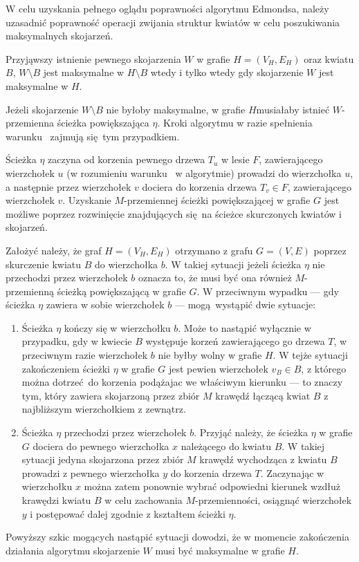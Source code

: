   W celu uzyskania pełnego oglądu poprawności algorytmu Edmondsa, należy uzasadnić poprawność operacji zwijania struktur kwiatów w celu poszukiwania maksymalnych skojarzeń.
  \begin{theorem}
    Przyjąwszy istnienie pewnego skojarzenia $W$ w grafie $H=(V_H, E_H)$ oraz kwiatu $B$, $W \setminus B$ jest maksymalne w $H \setminus B$ wtedy i tylko wtedy gdy skojarzenie $W$ jest maksymalne w $H$.
  \end{theorem}
  \begin{bproof}
    Jeżeli skojarzenie $W \setminus B$ nie byłoby maksymalne, w grafie $H$musiałaby istnieć $W$-przemienna ścieżka powiększająca $\eta$.
    Kroki algorytmu w razie spełnienia warunku~ zajmują się tym przypadkiem.

    Ścieżka $\eta$ zaczyna od korzenia pewnego drzewa $T_u$ w lesie $F$, zawierającego wierzchołek $u$ (w rozumieniu warunku~ w algorytmie) prowadzi do wierzchołka $u$, a następnie przez wierzchołek $v$ dociera do korzenia drzewa $T_v \in F$, zawierającego wierzchołek $v$.
    Uzyskanie $M$-przemiennej ścieżki powiększającej w grafie $G$ jest możliwe poprzez rozwinięcie znajdujących się na ścieżce skurczonych kwiatów i 
    skojarzeń.

    Założyć należy, że graf $H=(V_H, E_H)$ otrzymano z grafu $G=(V, E)$ poprzez skurczenie kwiatu $B$ do wierzchołka $b$.
    W takiej sytuacji jeżeli ścieżka $\eta$ nie przechodzi przez wierzchołek $b$ oznacza to, że musi być ona również $M$-przemienną ścieżką powiększającą w grafie $G$. W przeciwnym wypadku --- gdy ścieżka $\eta$ zawiera w sobie wierzchołek $b$ --- mogą wystąpić dwie sytuacje:
    \begin{enumerate}
      \item Ścieżka $\eta$ kończy się w wierzchołku $b$.
      Może to nastąpić wyłącznie w przypadku, gdy w kwiecie $B$ występuje korzeń zawierającego go drzewa $T$, w przeciwnym razie wierzchołek $b$ nie byłby wolny w grafie $H$.
      W tejże sytuacji zakończeniem ścieżki $\eta$ w grafie $G$ jest pewien wierzchołek $v_B \in B$, z którego można dotrzeć do korzenia podążajac we właściwym kierunku --- to znaczy tym, który zawiera skojarzoną przez zbiór $M$ krawędź łączącą kwiat $B$ z najbliższym wierzchołkiem z zewnątrz.
      \item Ścieżka $\eta$ przechodzi przez wierzchołek $b$.
      Przyjąć należy, że ścieżka $\eta$ w grafie $G$ dociera do pewnego wierzchołka $x$ należącego do kwiatu $B$.
      W takiej sytuacji jedyna skojarzona przez zbiór $M$ krawędź wychodząca z kwiatu $B$ prowadzi z pewnego wierzchołka $y$ do korzenia drzewa $T$.
      Zaczynając w wierzchołku $x$ można zatem ponownie wybrać odpowiedni kierunek wzdłuż krawędzi kwiatu $B$ w celu zachowania $M$-przemienności, osiągnąć wierzchołek $y$ i postępować dalej zgodnie z kształtem ścieżki $\eta$.
    \end{enumerate}

    Powyższy szkic mogących nastąpić sytuacji dowodzi, że w momencie zakończenia działania algorytmu skojarzenie $W$ musi być maksymalne w grafie $H$.
  \end{bproof}
